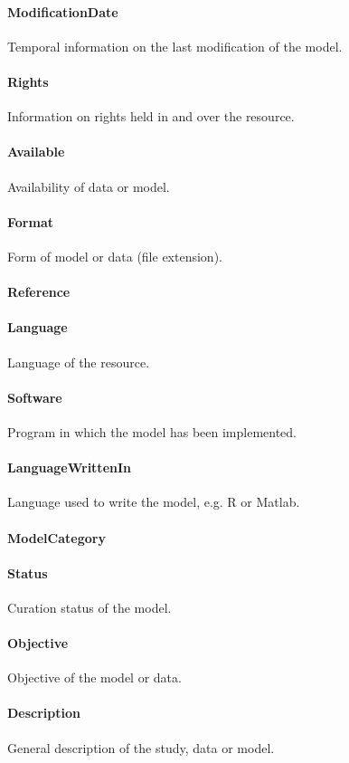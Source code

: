\documentclass[a4paper]{report}
\begin{document}
\paragraph{ModificationDate}
Temporal information on the last modification of the model.

\paragraph{Rights}
Information on rights held in and over the resource.

\paragraph{Available}
Availability of data or model.

\paragraph{Format}
Form of model or data (file extension).

\paragraph{Reference}

\paragraph{Language}
Language of the resource.

\paragraph{Software}
Program in which the model has been implemented.

\paragraph{LanguageWrittenIn}
Language used to write the model, e.g. R or Matlab.

\paragraph{ModelCategory}

\paragraph{Status}
Curation status of the model.

\paragraph{Objective}
Objective of the model or data.

\paragraph{Description}
General description of the study, data or model.
\end{document}
